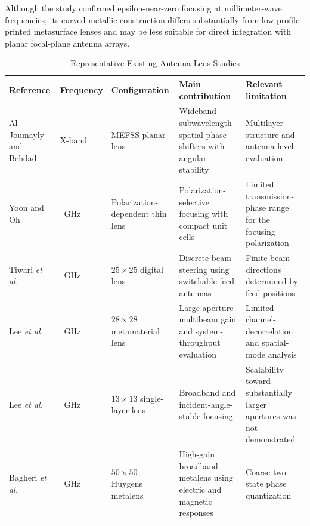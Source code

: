 Although the study confirmed epsilon-near-zero focusing at
millimeter-wave frequencies, its curved metallic construction differs
substantially from low-profile printed metasurface lenses and may be
less suitable for direct integration with planar focal-plane antenna
arrays.


\begin{table}[t]
\centering
\caption{Representative Existing Antenna-Lens Studies}
\label{tab:existing_lens_studies}
\small
\renewcommand{\arraystretch}{1.15}
\begin{tabularx}{\textwidth}
{
>{\raggedright\arraybackslash}p{2.4cm}
>{\centering\arraybackslash}p{1.3cm}
>{\raggedright\arraybackslash}p{2.1cm}
>{\raggedright\arraybackslash}X
>{\raggedright\arraybackslash}X
}
\toprule
Reference &
Frequency &
Configuration &
Main contribution &
Relevant limitation \\
\midrule

Al-Joumayly and Behdad \cite{Al-Joumayly2011} &
X-band &
MEFSS planar lens &
Wideband subwavelength spatial phase shifters with angular stability &
Multilayer structure and antenna-level evaluation \\

Yoon and Oh \cite{Yoon2019} &
28~GHz &
Polarization-dependent thin lens &
Polarization-selective focusing with compact unit cells &
Limited transmission-phase range for the focusing polarization \\

Tiwari \textit{et al.} \cite{Tiwari2023} &
28~GHz &
$25\times25$ digital lens &
Discrete beam steering using switchable feed antennas &
Finite beam directions determined by feed positions \\

Lee \textit{et al.} \cite{Lee2022Large} &
28~GHz &
$28\times28$ metamaterial lens &
Large-aperture multibeam gain and system-throughput evaluation &
Limited channel-decorrelation and spatial-mode analysis \\

Lee \textit{et al.} \cite{Lee2021} &
38~GHz &
$13\times13$ single-layer lens &
Broadband and incident-angle-stable focusing &
Scalability toward substantially larger apertures was not demonstrated \\

Bagheri \textit{et al.} \cite{Bagheri2023} &
69~GHz &
$50\times50$ Huygens metalens &
High-gain broadband metalens using electric and magnetic responses &
Coarse two-state phase quantization \\


\end{tabularx}
\end{table}

